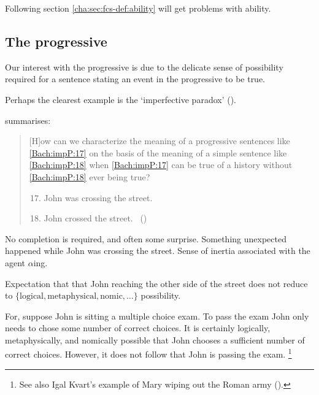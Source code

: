 \begin{note}
  Following section \autoref{cha:sec:fcs-def:ability} will get problems with ability.
\end{note}

\subsection{The progressive}
\label{cha:fcs:sec:progressive}

\begin{note}
  Our interest with the progressive is due to the delicate sense of possibility required for a sentence stating an event in the progressive to be true.

  Perhaps the clearest example is the `imperfective paradox' (\citeyear[cf.][Ch.3.1]{Dowty:1979vq}).

  \citeauthor{Bach:1986tb} summarises:
  \begin{quote}
    [H]ow can we characterize the meaning of a progressive sentences like \ref{Bach:impP:17} on the basis of the meaning of a simple sentence like \ref{Bach:impP:18} when \ref{Bach:impP:17} can be true of a history without \ref{Bach:impP:18} ever being true?
    \begin{enumerate}[label=(\arabic*), ref=(\arabic*)]
      \setcounter{enumi}{16}
    \item
      \label{Bach:impP:17}
      John was crossing the street.
    \item
      \label{Bach:impP:18}
      John crossed the street.%
      \mbox{ }\hfill\mbox{(\citeyear[12]{Bach:1986tb})}
    \end{enumerate}
  \end{quote}

  No completion is required, and often some surprise.
  Something unexpected happened while John was crossing the street.
  Sense of inertia associated with the agent \(\alpha\)ing.

  Expectation that that John reaching the other side of the street does not reduce to \(\{\text{logical}, \text{metaphysical}, \text{nomic}, \dots\}\) possibility.

  For, suppose John is sitting a multiple choice exam.
  To pass the exam John only needs to chose some number of correct choices.
  It is certainly logically, metaphysically, and nomically possible that John chooses a sufficient number of correct choices.
  However, it does not follow that John is passing the exam.%
  \footnote{
    See also Igal Kvart's example of Mary wiping out the Roman army (\cite[18]{Landman:1992wh}).
  }


\end{note}
